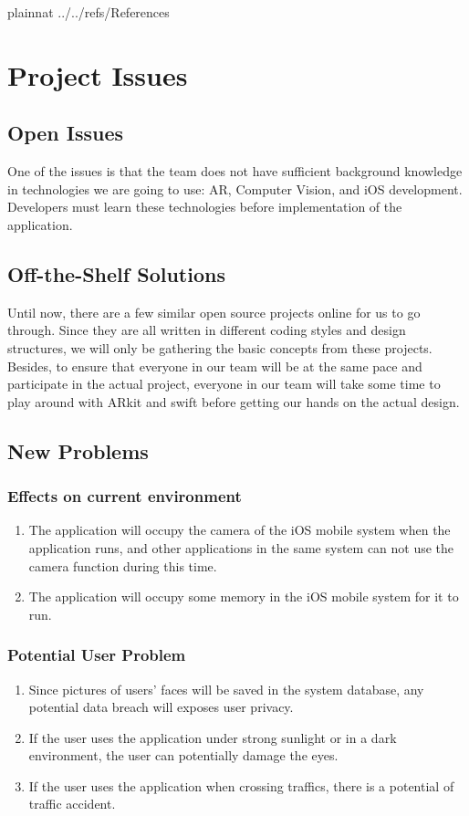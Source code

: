 \documentclass[12pt]{article}
\begin{document}
 {plainnat}
 {../../refs/References}

\section{Project Issues}

\subsection{Open Issues}
One of the issues is that the team does not have sufficient background knowledge in technologies we are going to use: AR, Computer Vision, and iOS development. Developers must learn these technologies before implementation of the application.


\subsection{Off-the-Shelf Solutions}
Until now, there are a few similar open source projects online for us to go through. Since they are all written in different coding styles and design structures, we will only be gathering the basic concepts from these projects. Besides, to ensure that everyone in our team will be at the same pace and participate in the actual project, everyone in our team will take some time to play around with ARkit and swift before getting our hands on the actual design.

\subsection{New Problems}
\subsubsection{Effects on current environment}
\begin{enumerate}
    \item The application will occupy the camera of the iOS mobile system when the application runs, and other applications in the same system can not use the camera function during this time.
    \item The application will occupy some memory in the iOS mobile system for it to run.
\end{enumerate}

\subsubsection{Potential User Problem}
\begin{enumerate}
    \item Since pictures of users' faces will be saved in the system database,
    any potential data breach will exposes user privacy. 
    \item If the user uses the application under strong sunlight or in a dark environment, the user can potentially damage the eyes.
    \item If the user uses the application when crossing traffics, there is a potential of traffic accident.
\end{enumerate}
\end{document}
